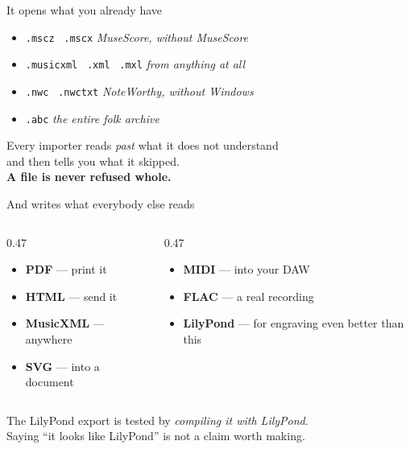 \documentclass[aspectratio=169,12pt]{beamer}
\newcommand{\hi}[1]{{\color{accent}\textbf{#1}}}
\newcommand{\punch}[1]{\begin{center}{\large #1}\end{center}}
\begin{document}
\begin{frame}{It opens what you already have}
  \vspace{0.8em}
  \begin{itemize}\setlength\itemsep{0.7em}
    \item \texttt{.mscz} \ \texttt{.mscx} \hfill \textit{\color{quiet}MuseScore, without MuseScore}
    \item \texttt{.musicxml} \ \texttt{.xml} \ \texttt{.mxl} \hfill \textit{\color{quiet}from anything at all}
    \item \texttt{.nwc} \ \texttt{.nwctxt} \hfill \textit{\color{quiet}NoteWorthy, without Windows}
    \item \texttt{.abc} \hfill \textit{\color{quiet}the entire folk archive}
  \end{itemize}
  \vspace{1.3em}
  \punch{Every importer reads \emph{past} what it does not understand\\
  and then tells you what it skipped.\\[0.4em]
  \hi{A file is never refused whole.}}
\end{frame}

\begin{frame}{And writes what everybody else reads}
  \vspace{0.9em}
  \begin{columns}[T]
    \begin{column}{0.47\textwidth}
      \begin{itemize}\setlength\itemsep{0.65em}
        \item \hi{PDF} --- print it
        \item \hi{HTML} --- send it
        \item \hi{MusicXML} --- anywhere
        \item \hi{SVG} --- into a document
      \end{itemize}
    \end{column}
    \begin{column}{0.47\textwidth}
      \begin{itemize}\setlength\itemsep{0.65em}
        \item \hi{MIDI} --- into your DAW
        \item \hi{FLAC} --- a real recording
        \item \hi{LilyPond} --- for engraving even better than this
      \end{itemize}
    \end{column}
  \end{columns}
  \vspace{1.3em}
  \punch{\color{quiet}The LilyPond export is tested by \emph{compiling it with LilyPond}.\\
  Saying ``it looks like LilyPond'' is not a claim worth making.}
\end{frame}
\end{document}
